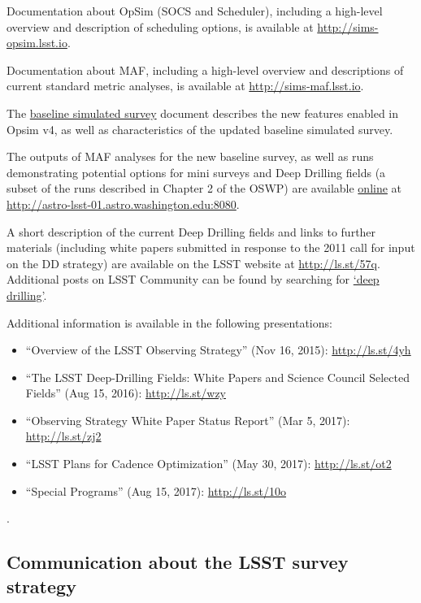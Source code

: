 \documentclass[DM,lsstdraft,toc,usenatbib]{lsstdoc}
\begin{document}
Documentation about OpSim (SOCS and Scheduler), including a high-level overview and description of scheduling options, is available at \url{http://sims-opsim.lsst.io}.

Documentation about MAF, including a high-level overview and descriptions of current standard metric analyses, is available at \url{http://sims-maf.lsst.io}. 

The \href{https://github.com/lsst-pst/survey_strategy/blob/master/db/baseline-doc/baseline.pdf}{baseline simulated survey} document describes the new features enabled in Opsim v4, as well as characteristics of the updated baseline simulated survey. 

The outputs of MAF analyses for the new baseline survey, as well as runs demonstrating potential options for mini surveys and Deep 
Drilling fields (a subset of the runs described in Chapter 2 of the OSWP) are available \href{http://astro-lsst-01.astro.washington.edu:8080}{online} at \url{http://astro-lsst-01.astro.washington.edu:8080}. 

A short description of the current Deep Drilling fields and links to further materials (including white papers submitted in response to the 2011 call for input on the DD strategy) are available on the LSST website at \href{https://www.lsst.org/scientists/survey-design/ddf}{http://ls.st/57q}. Additional posts on LSST Community can be found by searching for \href{https://community.lsst.org/search?q=deep%20drilling}{`deep drilling'}. 

Additional information is available in the following presentations:
\begin{itemize}
\item ``Overview of the LSST Observing Strategy'' (Nov 16, 2015): \url{http://ls.st/4yh}
\item ``The LSST Deep-Drilling Fields: White Papers and Science Council Selected Fields'' (Aug 15, 2016): \url{http://ls.st/wzy}
\item ``Observing Strategy White Paper Status Report'' (Mar 5, 2017): \url{http://ls.st/zj2}
\item ``LSST Plans for Cadence Optimization'' (May 30, 2017): \url{http://ls.st/ot2}
\item ``Special Programs'' (Aug 15, 2017): \url{http://ls.st/10o}
\end{itemize}.


\subsection{Communication about the LSST survey strategy} 
\end{document}
